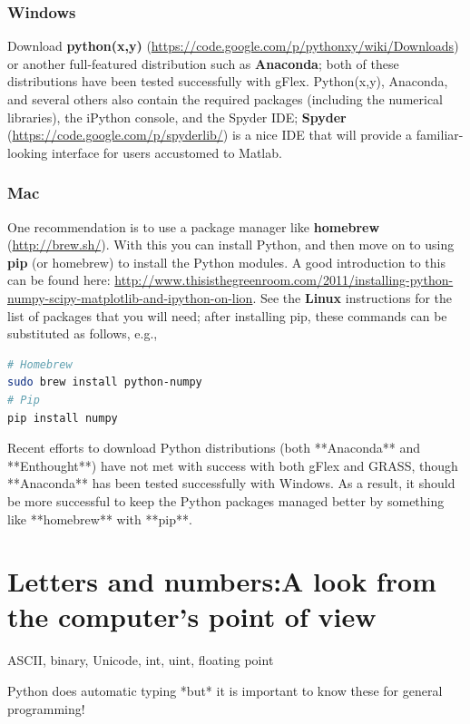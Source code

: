 \documentclass[a4paper,10pt]{scrartcl}
\begin{document}
\subsubsection{Windows}

Download \textbf{python(x,y)} (\url{https://code.google.com/p/pythonxy/wiki/Downloads}) or another full-featured distribution such as \textbf{Anaconda}; both of these distributions have been tested successfully with gFlex. Python(x,y), Anaconda, and several others also contain the required packages (including the numerical libraries), the iPython console, and the Spyder IDE; \textbf{Spyder} (\url{https://code.google.com/p/spyderlib/}) is a nice IDE that will provide a familiar-looking interface for users accustomed to Matlab.

\subsubsection{Mac}

One recommendation is to use a package manager like \textbf{homebrew} (\url{http://brew.sh/}). With this you can install Python, and then move on to using \textbf{pip} (or homebrew) to install the Python modules. A good introduction to this can be found here: \url{http://www.thisisthegreenroom.com/2011/installing-python-numpy-scipy-matplotlib-and-ipython-on-lion}. See the \textbf{Linux} instructions for the list of packages that you will need; after installing pip, these commands can be substituted as follows, e.g.,

\begin{lstlisting}[language=sh]
# Homebrew
sudo brew install python-numpy
# Pip
pip install numpy
\end{lstlisting}

Recent efforts to download Python distributions (both **Anaconda** and **Enthought**) have not met with success with both gFlex and GRASS, though **Anaconda** has been tested successfully with Windows. As a result, it should be more successful to keep the Python packages managed better by something like **homebrew** with **pip**.

\section{Letters and numbers:A look from the computer's point of view}

ASCII, binary, Unicode, int, uint, floating point

Python does automatic typing *but* it is important to know these for general programming!
\end{document}
